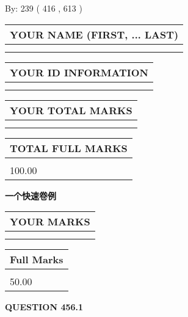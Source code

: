 \documentclass{ctexart}
\begin{document}
   
\hspace{1.0in} By: 
 239 ( 416 ,  613 )
   
   
   
   
\newpage 
\setcounter{page}{ 
   456001 } 
   
   
   
   
\noindent\begin{tabular}{|l|}
\hline
YOUR NAME (FIRST, ... LAST)  \\
\hline
 \\ 
 \\ 
\hline
\end{tabular}
\hspace{0.05in} \begin{tabular}{|l|}
\hline
 YOUR   ID   INFORMATION  \\
\hline
 \\ 
 \\ 
\hline
\end{tabular}
   
   
\vspace{0.2in}\noindent\begin{tabular}{|l|}
\hline
YOUR TOTAL MARKS  \\
\hline
 \\ 
 \\ 
\hline
\end{tabular}
\hspace{0.05in} \begin{tabular}{|l|}
\hline
TOTAL FULL MARKS  \\
\hline
 \\ 
100.00 \\
\hline
\end{tabular}
   
   
 \vspace{0.2in}
{\LARGE {\textbf{ 一个快速卷例}}}
   
   
  
\vspace{0.2in}
  
\noindent\begin{tabular}{|l|}
\hline
 YOUR MARKS  \\
\hline
 \\ 
 \\ 
\hline
\end{tabular}
\hspace{0.05in} \begin{tabular}{|l|}
\hline
 Full Marks  \\
\hline
 \\ 
50.00 \\
\hline
\end{tabular}
{\textbf{\Large{QUESTION
456.1 
}}}
  
\end{document}

